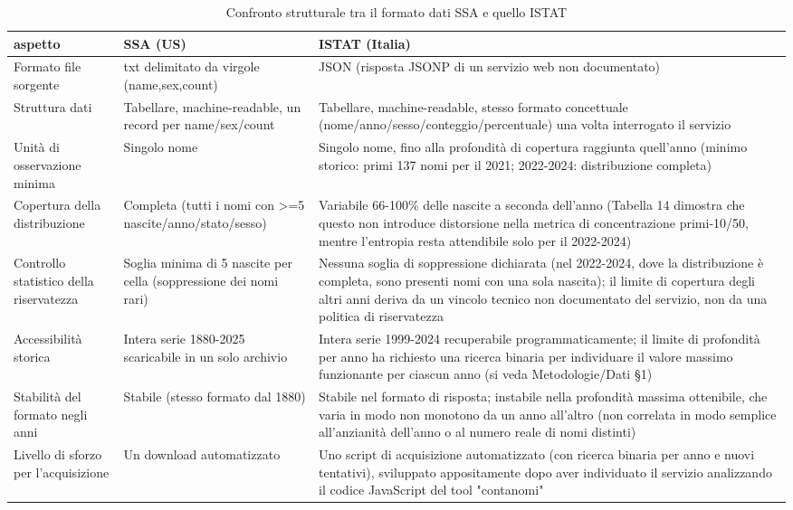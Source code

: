 \begin{table}[t]
\centering
\scriptsize
\caption{Confronto strutturale tra il formato dati SSA e quello ISTAT}
\label{tab:istat_vs_ssa}
\begin{tabular}{>{\raggedright\arraybackslash}p{3.2cm} >{\raggedright\arraybackslash}p{6.3cm} >{\raggedright\arraybackslash}p{6.3cm}}
\toprule
\textbf{aspetto} & \textbf{SSA (US)} & \textbf{ISTAT (Italia)} \\
\midrule
Formato file sorgente & txt delimitato da virgole (name,sex,count) & JSON (risposta JSONP di un servizio web non documentato) \\
Struttura dati & Tabellare, machine-readable, un record per name/sex/count & Tabellare, machine-readable, stesso formato concettuale (nome/anno/sesso/conteggio/percentuale) una volta interrogato il servizio \\
Unità di osservazione minima & Singolo nome & Singolo nome, fino alla profondità di copertura raggiunta quell'anno (minimo storico: primi 137 nomi per il 2021; 2022-2024: distribuzione completa) \\
Copertura della distribuzione & Completa (tutti i nomi con >=5 nascite/anno/stato/sesso) & Variabile 66-100\% delle nascite a seconda dell'anno (Tabella 14 dimostra che questo non introduce distorsione nella metrica di concentrazione primi-10/50, mentre l'entropia resta attendibile solo per il 2022-2024) \\
Controllo statistico della riservatezza & Soglia minima di 5 nascite per cella (soppressione dei nomi rari) & Nessuna soglia di soppressione dichiarata (nel 2022-2024, dove la distribuzione è completa, sono presenti nomi con una sola nascita); il limite di copertura degli altri anni deriva da un vincolo tecnico non documentato del servizio, non da una politica di riservatezza \\
Accessibilità storica & Intera serie 1880-2025 scaricabile in un solo archivio & Intera serie 1999-2024 recuperabile programmaticamente; il limite di profondità per anno ha richiesto una ricerca binaria per individuare il valore massimo funzionante per ciascun anno (si veda Metodologie/Dati §1) \\
Stabilità del formato negli anni & Stabile (stesso formato dal 1880) & Stabile nel formato di risposta; instabile nella profondità massima ottenibile, che varia in modo non monotono da un anno all'altro (non correlata in modo semplice all'anzianità dell'anno o al numero reale di nomi distinti) \\
Livello di sforzo per l'acquisizione & Un download automatizzato & Uno script di acquisizione automatizzato (con ricerca binaria per anno e nuovi tentativi), sviluppato appositamente dopo aver individuato il servizio analizzando il codice JavaScript del tool "contanomi" \\

\end{tabular}
\end{table}

